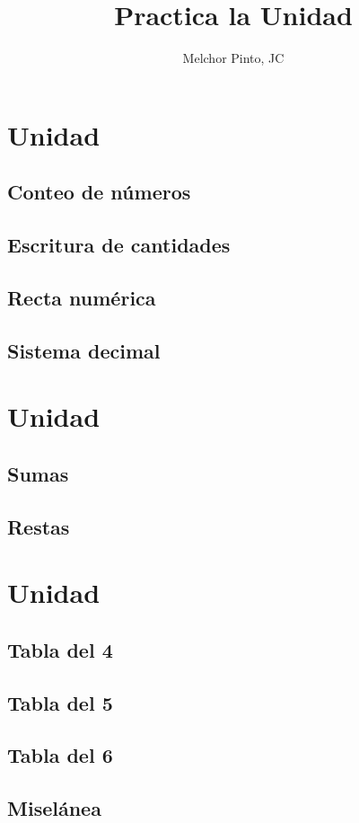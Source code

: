 \documentclass[12pt,addpoints]{repaso}
\title{Practica la Unidad}
\author{Melchor Pinto, JC}
\begin{document}
\INFO%
\tableofcontents
\newpage
\begin{questions}\large
	\section{Unidad}

	\subsection{Conteo de números}
	\subsection{Escritura de cantidades}
	\subsection{Recta numérica}
	\subsection{Sistema decimal}

	\section{Unidad}

	\subsection{Sumas}
	\subsection{Restas}

	\section{Unidad}

	\subsection{Tabla del 4}
	\subsection{Tabla del 5}
	\subsection{Tabla del 6}
	\subsection{Miselánea}
	\questionboxed[10]{}
\end{questions}
\end{document}
